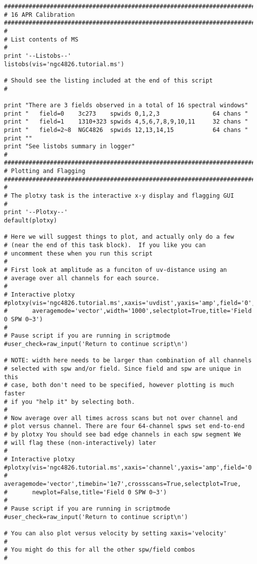 \begin{verbatim}
##########################################################################
# 16 APR Calibration
##########################################################################
#
# List contents of MS
#
print '--Listobs--'
listobs(vis='ngc4826.tutorial.ms')

# Should see the listing included at the end of this script
#

print "There are 3 fields observed in a total of 16 spectral windows"
print "   field=0    3c273    spwids 0,1,2,3               64 chans "
print "   field=1    1310+323 spwids 4,5,6,7,8,9,10,11     32 chans "
print "   field=2~8  NGC4826  spwids 12,13,14,15           64 chans "
print ""
print "See listobs summary in logger"
#
##########################################################################
# Plotting and Flagging
##########################################################################
#
# The plotxy task is the interactive x-y display and flagging GUI
#
print '--Plotxy--'
default(plotxy)

# Here we will suggest things to plot, and actually only do a few
# (near the end of this task block).  If you like you can
# uncomment these when you run this script
#
# First look at amplitude as a funciton of uv-distance using an
# average over all channels for each source.
#
# Interactive plotxy
#plotxy(vis='ngc4826.tutorial.ms',xaxis='uvdist',yaxis='amp',field='0',spw='0~3',
#       averagemode='vector',width='1000',selectplot=True,title='Field 0 SPW 0~3')
#       
# Pause script if you are running in scriptmode
#user_check=raw_input('Return to continue script\n')

# NOTE: width here needs to be larger than combination of all channels
# selected with spw and/or field. Since field and spw are unique in this
# case, both don't need to be specified, however plotting is much faster
# if you "help it" by selecting both.
#
# Now average over all times across scans but not over channel and
# plot versus channel. There are four 64-channel spws set end-to-end
# by plotxy You should see bad edge channels in each spw segment We
# will flag these (non-interactively) later
#
# Interactive plotxy
#plotxy(vis='ngc4826.tutorial.ms',xaxis='channel',yaxis='amp',field='0',spw='0~3',
#       averagemode='vector',timebin='1e7',crossscans=True,selectplot=True,
#       newplot=False,title='Field 0 SPW 0~3')
#
# Pause script if you are running in scriptmode
#user_check=raw_input('Return to continue script\n')

# You can also plot versus velocity by setting xaxis='velocity'
#
# You might do this for all the other spw/field combos
#


\end{verbatim}
